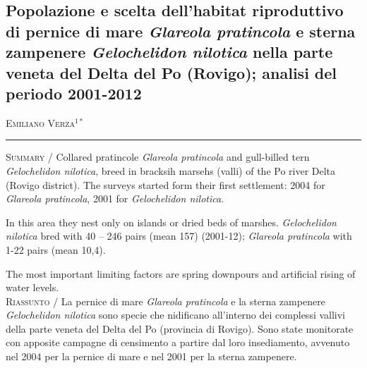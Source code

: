 \setcounter{figure}{0}
\setcounter{table}{0}

\begin{adjustwidth}{-3.5cm}{0cm}
\pagestyle{CIOpage}
\chapter*[La pernice di mare e la sterna zampenere nel Delta del
Po]{Popolazione e scelta dell{\textquoteright}habitat riproduttivo
di pernice di mare \textbf{\textit{Glareola pratincola }}\textbf{e
sterna zampenere }\textbf{\textit{Gelochelidon nilotica}}\textbf{ nella
parte veneta del Delta del Po (Rovigo); analisi del periodo 2001-2012}}

\textsc{Emiliano Verza}$^{1*}$\\

\noindent\color{MUSEBLUE}\rule{27cm}{2pt}
\vspace{1cm}
\end{adjustwidth}


{\small
\noindent \textsc{\color{MUSEBLUE} Summary} / Collared pratincole \textit{Glareola pratincola} and gull-billed tern
\textit{Gelochelidon nilotica}, breed in bracksih marsehs (valli) of
the Po river Delta (Rovigo district). The surveys started form their
first settlement: 2004 for \textit{Glareola pratincola}, 2001 for
\textit{Gelochelidon nilotica}.

In this area they nest only on islands or dried beds of marshes.
\textit{Gelochelidon nilotica} bred with 40 -- 246 pairs (mean 157)
(2001-12); \textit{Glareola pratincola} with 1-22 pairs (mean 10,4).

The most important limiting factors are spring downpours and artificial
rising of water levels. \\
\noindent \textsc{\color{MUSEBLUE} Riassunto} / La pernice di mare \textit{Glareola pratincola }e la sterna zampenere
\textit{Gelochelidon nilotica}\textbf{ }sono specie che nidificano
all{\textquoteright}interno dei complessi vallivi della parte veneta
del Delta del Po (provincia di Rovigo). Sono state monitorate con
apposite campagne di censimento a partire dal loro insediamento,
avvenuto nel 2004 per la pernice di mare e nel 2001 per la sterna
zampenere.
}

